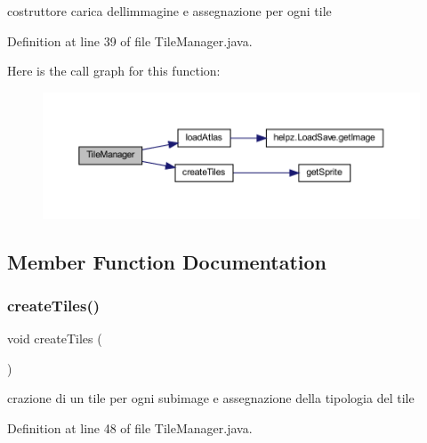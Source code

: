 costruttore carica dell\textquotesingle{}immagine e assegnazione per ogni tile 



Definition at line 39 of file Tile\+Manager.\+java.

Here is the call graph for this function\+:\nopagebreak
\begin{figure}[H]
\begin{center}
\leavevmode
\includegraphics[width=350pt]{classmanagers_1_1_tile_manager_a041c1b12a4eb5574dfedf0af6393c014_cgraph}
\end{center}
\end{figure}


\subsection{Member Function Documentation}
\mbox{\label{classmanagers_1_1_tile_manager_abb7fa074b36e6e355db16761115fb367}} 
\subsubsection{\texorpdfstring{create\+Tiles()}{createTiles()}}
{\footnotesize\ttfamily void create\+Tiles (\begin{DoxyParamCaption}{ }\end{DoxyParamCaption})\hspace{0.3cm}{\ttfamily [private]}}



crazione di un tile per ogni subimage e assegnazione della tipologia del tile 



Definition at line 48 of file Tile\+Manager.\+java.

